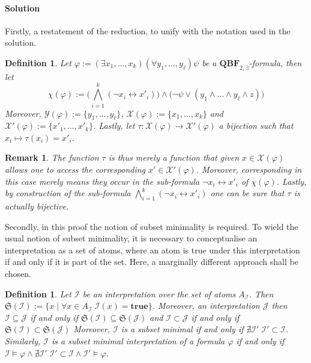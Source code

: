 \documentclass [11pt]{article}
\newcommand{\True}{\mathbf{true}}
\newtheorem{definition}[theorem]{Definition}
\newtheorem{remark}[theorem]{Remark}
\begin{document}
\paragraph*{Solution}

Firstly, a restatement of the reduction, to unify with the notation used in the solution. 

\begin{definition}
Let $\varphi:=(\exists x_1, \dots, x_k) (\forall y_1, \dots, y_\ell) \psi$ be a $\mathbf{QBF}_{2,\exists}$-formula, then let
\begin{equation*}
\chi(\varphi):=\big(\bigwedge_{i=1}^k (\neg x_i \leftrightarrow x'_i) \big)
\wedge \big( \neg \psi \vee (y_1 \wedge \dots 
\wedge y_\ell \wedge z)\big)
\end{equation*}
Moreover, $\mathcal{Y}(\varphi):= \{y_1, \dots, y_\ell\}$, $\mathcal{X}(\varphi):= \{x_1, \dots, x_k\}$ and $\mathcal{X}'(\varphi):=\{x'_1, \dots, x'_k\}$. Lastly, let $\tau: \mathcal{X}(\varphi) \to \mathcal{X}'(\varphi)$ a bijection such that $x_i \mapsto \tau(x_i)=x'_i$. 
\end{definition}

\begin{remark}
The function $\tau$ is thus merely a function that given $x\in \mathcal{X}(\varphi)$ allows one to access the corresponding $x' \in \mathcal{X}'(\varphi)$. Moreover, corresponding in this case merely means they occur in the sub-formula $\neg x_i \leftrightarrow x'_i$ of $\chi(\varphi)$. Lastly, by construction of the sub-formula $\bigwedge_{i=1}^k (\neg x_i \leftrightarrow x'_i) $ one can be sure that $\tau$ is actually bijective.
\end{remark}
Secondly, in this proof the notion of subset minimality is required. To wield the usual notion of subset minimality, it is necessary to conceptualise an interpretation as a set of atoms, where an atom is true under this interpretation if and only if it is part of the set. Here, a marginally different approach shall be chosen.


\begin{definition}
Let $\mathcal{I}$ be an interpretation over the set of atoms $A_{\mathcal{I}}$. Then $\mathfrak{S}(\mathcal{I}):=\{x \mid \forall x\in A_{\mathcal{I}} \; \mathcal{I}(x)=\True\}$. Moreover, an interpretation $\mathcal{J}$ then $\mathcal{I} \subseteq \mathcal{J}$ if and only if $\mathfrak{S}(\mathcal{I}) \subseteq \mathfrak{S}(\mathcal{J})$ and $\mathcal{I} \subset \mathcal{J}$ if and only if $\mathfrak{S}(\mathcal{I}) \subset \mathfrak{S}(\mathcal{J})$
Moreover, $\mathcal{I}$ is a subset minimal if and only if $\nexists \mathcal{I}' \;  \mathcal{I}' \subset \mathcal{I}$.
Similarly, $\mathcal{I}$ is a subset minimal interpretation of a formula $\varphi$ if and only if $\mathcal{I}\models \varphi \land \nexists \mathcal{I}' \;  \mathcal{I}' \subset \mathcal{I} \land \mathcal{I}'\models \varphi$.
\end{definition}
\end{document}

